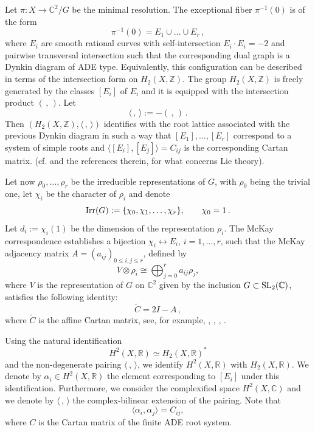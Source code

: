 \documentclass[a4paper,reqno]{amsart}
\theoremstyle{plain} %
\theoremstyle{definition} %
\theoremstyle{remark} %
\newcommand{\Z}{\mathbb{Z}}
\newcommand{\C}{\mathbb{C}}
\newcommand{\1}{\mathds{1}}   %
\begin{document}
Let $\pi \colon X \to \C^2/G$ be the minimal resolution. The exceptional fiber $\pi^{-1}(0)$ is of the form
\[
\pi^{-1}(0)=E_1 \cup \ldots \cup E_r \, ,
\]
where $E_i$ are smooth rational curves with self-intersection $E_i \cdot E_i = -2$ and pairwise transversal intersection
such that the corresponding dual graph is a Dynkin diagram of ADE type. 
Equivalently, this configuration can be described in terms of the
intersection form on $H_2(X,\mathbb Z)$.
The group $H_2(X, \Z)$ is freely generated by the classes 
$[E_i]$ of $E_i$ and it is equipped with the intersection product $( \, , \, )$. Let 
\[
\langle \, , \, \rangle := - ( \, , \, ) \, .
\]
Then $\left( H_2(X, \Z), \langle \, , \, \rangle \right)$ identifies with the root lattice associated with the previous Dynkin diagram
in such a way that $[E_1], \ldots , [E_r]$ correspond to a system of simple roots and $\langle [E_i] , [E_j] \rangle = C_{ij}$
is the corresponding Cartan matrix.
(cf. \cite{CS98} and the references therein, \cite{Humphreys} for what concerns Lie theory).

Let now $\rho_0, \ldots , \rho_r$ be the irreducible representations of $G$, with $\rho_0$ being the trivial one,
let $\chi_i$ be the character of $\rho_i$ and denote
\[
{\rm Irr}(G):=\{\chi_0,\chi_1,\ldots,\chi_r\},
\qquad \chi_0=1 \, .
\]
Let $d_i:=\chi_i(1)$ be the dimension of the representation $\rho_i$. 
The McKay correspondence establishes a bijection  $\chi_i \longleftrightarrow E_i$, $i=1, \ldots , r$,
such that the McKay adjacency matrix $A=(a_{ij})_{0\leq i,j\leq r}$,
defined by  
\[
V\otimes \rho_i\cong \bigoplus_{j=0}^r a_{ij}\rho_j,
\]
where  $V$ is the representation of $G$ on $\C^2$ given by the inclusion $G\subset {\rm SL}_2(\C)$, satisfies the following identity:
\[
\widetilde C=2I-A \, ,
\]
where $\widetilde C$ is the affine Cartan matrix,  
see, for example,  \cite{GSVMcKay},  \cite{McKay}, \cite{ReidMcKay}, \cite{DolgachevMcKay}. 

Using the natural identification
\[
H^2(X,\mathbb R)\simeq H_2(X,\mathbb R)^*
\]
and the non-degenerate pairing $\langle\, ,\,\rangle$, we identify
$H^2(X,\mathbb R)$ with $H_2(X,\mathbb R)$.
We denote by $\alpha_i\in H^2(X,\mathbb R)$ the element corresponding
to $[E_i]$ under this identification.
Furthermore, we consider the complexified space $H^2(X, \C)$ and we denote by $\langle \, , \, \rangle$
the  complex-bilinear extension of the pairing. Note that
\[
\langle\alpha_i,\alpha_j\rangle=C_{ij},
\]
where $C$ is the Cartan matrix of the finite ADE root system.
\end{document}
